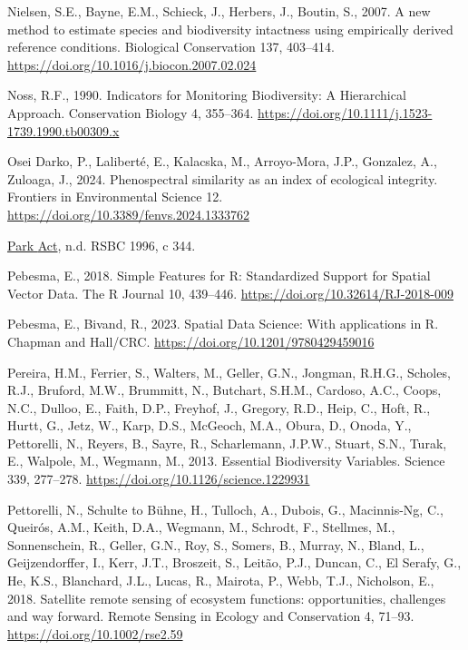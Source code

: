 \documentclass[
]{agujournal2019}
\newlength{\cslhangindent}
\newenvironment{CSLReferences}[2] %
 {\begin{list}{}{%
  \setlength{\itemindent}{0pt}
  \setlength{\leftmargin}{0pt}
  \setlength{\parsep}{0pt}
  \ifodd #1
   \setlength{\leftmargin}{\cslhangindent}
   \setlength{\itemindent}{-1\cslhangindent}
  \fi
  \setlength{\itemsep}{#2\baselineskip}}}
 {\end{list}}
\begin{document}
\begin{CSLReferences}{1}{0}
Nielsen, S.E., Bayne, E.M., Schieck, J., Herbers, J., Boutin, S., 2007.
A new method to estimate species and biodiversity intactness using
empirically derived reference conditions. Biological Conservation 137,
403--414. \url{https://doi.org/10.1016/j.biocon.2007.02.024}

Noss, R.F., 1990. Indicators for Monitoring Biodiversity: A Hierarchical
Approach. Conservation Biology 4, 355--364.
\url{https://doi.org/10.1111/j.1523-1739.1990.tb00309.x}

Osei Darko, P., Laliberté, E., Kalacska, M., Arroyo-Mora, J.P.,
Gonzalez, A., Zuloaga, J., 2024. Phenospectral similarity as an index of
ecological integrity. Frontiers in Environmental Science 12.
\url{https://doi.org/10.3389/fenvs.2024.1333762}

\href{https://www.bclaws.gov.bc.ca/civix/document/id/complete/statreg/96344_01}{Park
{Act}}, n.d. RSBC 1996, c 344.

Pebesma, E., 2018. {Simple Features for R: Standardized Support for
Spatial Vector Data}. {The R Journal} 10, 439--446.
\url{https://doi.org/10.32614/RJ-2018-009}

Pebesma, E., Bivand, R., 2023. {Spatial Data Science: With applications
in R}. {Chapman and Hall/CRC}.
\url{https://doi.org/10.1201/9780429459016}

Pereira, H.M., Ferrier, S., Walters, M., Geller, G.N., Jongman, R.H.G.,
Scholes, R.J., Bruford, M.W., Brummitt, N., Butchart, S.H.M., Cardoso,
A.C., Coops, N.C., Dulloo, E., Faith, D.P., Freyhof, J., Gregory, R.D.,
Heip, C., Hoft, R., Hurtt, G., Jetz, W., Karp, D.S., McGeoch, M.A.,
Obura, D., Onoda, Y., Pettorelli, N., Reyers, B., Sayre, R.,
Scharlemann, J.P.W., Stuart, S.N., Turak, E., Walpole, M., Wegmann, M.,
2013. Essential Biodiversity Variables. Science 339, 277--278.
\url{https://doi.org/10.1126/science.1229931}

Pettorelli, N., Schulte to Bühne, H., Tulloch, A., Dubois, G.,
Macinnis-Ng, C., Queirós, A.M., Keith, D.A., Wegmann, M., Schrodt, F.,
Stellmes, M., Sonnenschein, R., Geller, G.N., Roy, S., Somers, B.,
Murray, N., Bland, L., Geijzendorffer, I., Kerr, J.T., Broszeit, S.,
Leitão, P.J., Duncan, C., El Serafy, G., He, K.S., Blanchard, J.L.,
Lucas, R., Mairota, P., Webb, T.J., Nicholson, E., 2018. Satellite
remote sensing of ecosystem functions: opportunities, challenges and way
forward. Remote Sensing in Ecology and Conservation 4, 71--93.
\url{https://doi.org/10.1002/rse2.59}


\end{CSLReferences}
\end{document}
